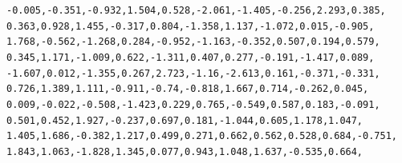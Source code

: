 \documentclass{report}\usepackage[]{graphicx}\usepackage[]{color}
\makeatletter
\newcommand{\hlnum}[1]{\textcolor[rgb]{0.686,0.059,0.569}{#1}}%
\newcommand{\hlopt}[1]{\textcolor[rgb]{0,0,0}{#1}}%
\newcommand{\hlstd}[1]{\textcolor[rgb]{0.345,0.345,0.345}{#1}}%
\newenvironment{kframe}{%
 \def\at@end@of@kframe{}%
 \ifinner\ifhmode%
  \def\at@end@of@kframe{\end{minipage}}%
  \begin{minipage}{\columnwidth}%
 \fi\fi%
 \def\FrameCommand##1{\hskip\@totalleftmargin \hskip-\fboxsep
 \colorbox{shadecolor}{##1}\hskip-\fboxsep
     \hskip-\linewidth \hskip-\@totalleftmargin \hskip\columnwidth}%
 \MakeFramed {\advance\hsize-\width
   \@totalleftmargin\z@ \linewidth\hsize
   \@setminipage}}%
 {\par\unskip\endMakeFramed%
 \at@end@of@kframe}
\newenvironment{knitrout}{}{} %
\makeatother
\begin{document}
\begin{knitrout}
\begin{kframe}
\begin{alltt}
    \hlopt{-}\hlnum{0.005}\hlstd{,} \hlopt{-}\hlnum{0.351}\hlstd{,} \hlopt{-}\hlnum{0.932}\hlstd{,} \hlnum{1.504}\hlstd{,} \hlnum{0.528}\hlstd{,} \hlopt{-}\hlnum{2.061}\hlstd{,} \hlopt{-}\hlnum{1.405}\hlstd{,} \hlopt{-}\hlnum{0.256}\hlstd{,} \hlnum{2.293}\hlstd{,} \hlnum{0.385}\hlstd{,}
    \hlnum{0.363}\hlstd{,} \hlnum{0.928}\hlstd{,} \hlnum{1.455}\hlstd{,} \hlopt{-}\hlnum{0.317}\hlstd{,} \hlnum{0.804}\hlstd{,} \hlopt{-}\hlnum{1.358}\hlstd{,} \hlnum{1.137}\hlstd{,} \hlopt{-}\hlnum{1.072}\hlstd{,} \hlnum{0.015}\hlstd{,} \hlopt{-}\hlnum{0.905}\hlstd{,}
    \hlnum{1.768}\hlstd{,} \hlopt{-}\hlnum{0.562}\hlstd{,} \hlopt{-}\hlnum{1.268}\hlstd{,} \hlnum{0.284}\hlstd{,} \hlopt{-}\hlnum{0.952}\hlstd{,} \hlopt{-}\hlnum{1.163}\hlstd{,} \hlopt{-}\hlnum{0.352}\hlstd{,} \hlnum{0.507}\hlstd{,} \hlnum{0.194}\hlstd{,} \hlnum{0.579}\hlstd{,}
    \hlnum{0.345}\hlstd{,} \hlnum{1.171}\hlstd{,} \hlopt{-}\hlnum{1.009}\hlstd{,} \hlnum{0.622}\hlstd{,} \hlopt{-}\hlnum{1.311}\hlstd{,} \hlnum{0.407}\hlstd{,} \hlnum{0.277}\hlstd{,} \hlopt{-}\hlnum{0.191}\hlstd{,} \hlopt{-}\hlnum{1.417}\hlstd{,} \hlnum{0.089}\hlstd{,}
    \hlopt{-}\hlnum{1.607}\hlstd{,} \hlnum{0.012}\hlstd{,} \hlopt{-}\hlnum{1.355}\hlstd{,} \hlnum{0.267}\hlstd{,} \hlnum{2.723}\hlstd{,} \hlopt{-}\hlnum{1.16}\hlstd{,} \hlopt{-}\hlnum{2.613}\hlstd{,} \hlnum{0.161}\hlstd{,} \hlopt{-}\hlnum{0.371}\hlstd{,} \hlopt{-}\hlnum{0.331}\hlstd{,}
    \hlnum{0.726}\hlstd{,} \hlnum{1.389}\hlstd{,} \hlnum{1.111}\hlstd{,} \hlopt{-}\hlnum{0.911}\hlstd{,} \hlopt{-}\hlnum{0.74}\hlstd{,} \hlopt{-}\hlnum{0.818}\hlstd{,} \hlnum{1.667}\hlstd{,} \hlnum{0.714}\hlstd{,} \hlopt{-}\hlnum{0.262}\hlstd{,} \hlnum{0.045}\hlstd{,}
    \hlnum{0.009}\hlstd{,} \hlopt{-}\hlnum{0.022}\hlstd{,} \hlopt{-}\hlnum{0.508}\hlstd{,} \hlopt{-}\hlnum{1.423}\hlstd{,} \hlnum{0.229}\hlstd{,} \hlnum{0.765}\hlstd{,} \hlopt{-}\hlnum{0.549}\hlstd{,} \hlnum{0.587}\hlstd{,} \hlnum{0.183}\hlstd{,} \hlopt{-}\hlnum{0.091}\hlstd{,}
    \hlnum{0.501}\hlstd{,} \hlnum{0.452}\hlstd{,} \hlnum{1.927}\hlstd{,} \hlopt{-}\hlnum{0.237}\hlstd{,} \hlnum{0.697}\hlstd{,} \hlnum{0.181}\hlstd{,} \hlopt{-}\hlnum{1.044}\hlstd{,} \hlnum{0.605}\hlstd{,} \hlnum{1.178}\hlstd{,} \hlnum{1.047}\hlstd{,}
    \hlnum{1.405}\hlstd{,} \hlnum{1.686}\hlstd{,} \hlopt{-}\hlnum{0.382}\hlstd{,} \hlnum{1.217}\hlstd{,} \hlnum{0.499}\hlstd{,} \hlnum{0.271}\hlstd{,} \hlnum{0.662}\hlstd{,} \hlnum{0.562}\hlstd{,} \hlnum{0.528}\hlstd{,} \hlnum{0.684}\hlstd{,} \hlopt{-}\hlnum{0.751}\hlstd{,}
    \hlnum{1.843}\hlstd{,} \hlnum{1.063}\hlstd{,} \hlopt{-}\hlnum{1.828}\hlstd{,} \hlnum{1.345}\hlstd{,} \hlnum{0.077}\hlstd{,} \hlnum{0.943}\hlstd{,} \hlnum{1.048}\hlstd{,} \hlnum{1.637}\hlstd{,} \hlopt{-}\hlnum{0.535}\hlstd{,} \hlnum{0.664}\hlstd{,}

\end{alltt}
\end{kframe}
\end{knitrout}
\end{document}

